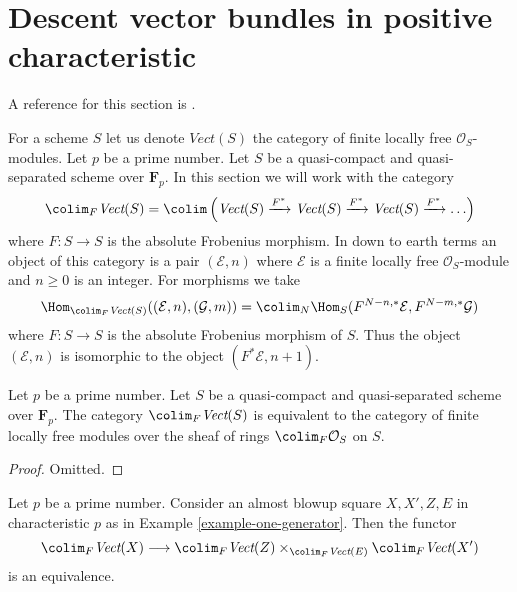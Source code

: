 \section{Descent vector bundles in positive characteristic}
\label{section-descent-vectorbundles-h}

\noindent
A reference for this section is \cite{Witt-Grass}.

\medskip\noindent
For a scheme $S$ let us denote $\textit{Vect}(S)$ the category
of finite locally free $\mathcal{O}_S$-modules.
Let $p$ be a prime number. Let $S$ be a quasi-compact and quasi-separated
scheme over $\mathbf{F}_p$. In this section we will work with the
category
$$
\colim_F \textit{Vect}(S) =
\colim
\left(
\textit{Vect}(S) \xrightarrow{F^*}
\textit{Vect}(S) \xrightarrow{F^*}
\textit{Vect}(S) \xrightarrow{F^*} \ldots
\right)
$$
where $F : S \to S$ is the absolute Frobenius morphism. In down
to earth terms an object of this category is a pair $(\mathcal{E}, n)$
where $\mathcal{E}$ is a finite locally free $\mathcal{O}_S$-module
and $n \geq 0$ is an integer. For morphisms we take
$$
\Hom_{\colim_F \textit{Vect}(S)}((\mathcal{E}, n), (\mathcal{G}, m)) =
\colim_N \Hom_S(F^{N - n, *}\mathcal{E}, F^{N - m, *}\mathcal{G})
$$
where $F : S \to S$ is the absolute Frobenius morphism of $S$.
Thus the object $(\mathcal{E}, n)$ is isomorphic to the object
$(F^*\mathcal{E}, n + 1)$.

\begin{lemma}
\label{lemma-colim-F-Vect}
Let $p$ be a prime number. Let $S$ be a quasi-compact and quasi-separated
scheme over $\mathbf{F}_p$. The category $\colim_F \textit{Vect}(S)$
is equivalent to the category of finite locally free modules
over the sheaf of rings $\colim_F \mathcal{O}_S$ on $S$.
\end{lemma}

\begin{proof}
Omitted.
\end{proof}

\begin{lemma}
\label{lemma-vector-bundle-I}
Let $p$ be a prime number. Consider an almost blowup square $X, X', Z, E$
in characteristic $p$ as in Example \ref{example-one-generator}.
Then the functor
$$
\colim_F \textit{Vect}(X)
\longrightarrow
\colim_F \textit{Vect}(Z)
\times_{\colim_F \textit{Vect}(E)}
\colim_F \textit{Vect}(X')
$$
is an equivalence.
\end{lemma}

